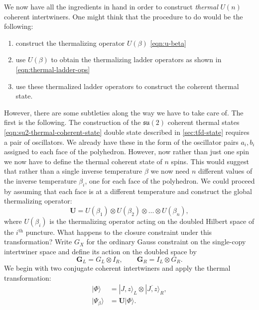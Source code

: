 \documentclass[twocolumn,draft,aps,nofootinbib,nobibnotes,final]{revtex4-2}
\newcommand{\mb}[1]{\mathbf{#1}}
\newcommand{\mf}[1]{\mathfrak{#1}}
\newcommand{\supersc}[1]{$^{\textrm{#1}}$}
\begin{document}
We now have all the ingredients in hand in order to construct \textit{thermal} $ U(n) $ coherent intertwiners. One might think that the procedure to do would be the following:
\begin{enumerate}[label=\emph{\alph*})]
	\item construct the thermalizing operator $ U(\beta) $ \eqref{eqn:u-beta}
	\item use $ U(\beta) $ to obtain the thermalizing ladder operators as shown in \eqref{eqn:thermal-ladder-ops}
	\item use these thermalized ladder operators to construct the coherent thermal state.
\end{enumerate}
However, there are some subtleties along the way we have to take care of. The first is the following. The construction of the $ \mf{su}(2) $ coherent thermal states \eqref{eqn:su2-thermal-coherent-state} double state described in \autoref{sec:tfd-state} requires a pair of oscillators. We already have these in the form of the oscillator pairs $ a_i, b_i $ assigned to each face of the polyhedron. However, now rather than just one spin we now have to define the thermal coherent state of $ n $ spins. This would suggest that rather than a single inverse temperature $ \beta $ we now need $ n $ different values of the inverse temperature $ \beta_i $, one for each face of the polyhedron. We could proceed by assuming that each face is at a different temperature and construct the global thermalizing operator:
\begin{equation}\label{eqn:global-u-beta}
	\mb{U} = U(\beta_1) \otimes U(\beta_2) \otimes \ldots \otimes U(\beta_n),
\end{equation}
where $ U(\beta_i) $ is the thermalizing operator acting on the doubled Hilbert space of the $ i $\supersc{th} puncture. What happens to the closure constraint under this transformation? Write $G_X$ for the ordinary Gauss constraint on the single-copy intertwiner space and define its action on the doubled space by
\begin{equation}\label{eqn:doubled-gauss}
 \boldsymbol{G}_L=G_L\otimes I_R,\qquad
 \boldsymbol{G}_R=I_L\otimes G_R.
\end{equation}
We begin with two conjugate coherent intertwiners and apply the thermal transformation:
\begin{equation}\label{eqn:two-copy-fl-state}
\begin{aligned}
 |\Phi\rangle&=|J,z\rangle_L\otimes|\overline{J,z}\rangle_R,\\
 |\Psi_\beta\rangle&=\mb{U}|\Phi\rangle.
\end{aligned}
\end{equation}
\end{document}
